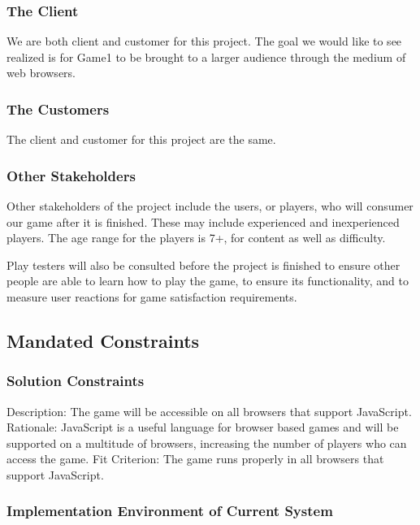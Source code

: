 \documentclass[12pt, titlepage]{article}
\begin{document}
\subsubsection{The Client}

We are both client and customer for this project. The goal we would like to see realized is for Game1 to be brought to a larger audience through the medium of web browsers. 

\subsubsection{The Customers}

The client and customer for this project are the same.

\subsubsection{Other Stakeholders}

Other stakeholders of the project include the users, or players, who will consumer our game after it is finished. These may include experienced and inexperienced players. The age range for the players is 7+, for content as well as difficulty. 

Play testers will also be consulted before the project is finished to ensure other people are able to learn how to play the game, to ensure its functionality, and to measure user reactions for game satisfaction requirements. 

\subsection{Mandated Constraints}

\subsubsection{Solution Constraints}

Description: The game will be accessible on all browsers that support JavaScript. 
Rationale: JavaScript is a useful language for browser based games and will be supported on a multitude of browsers, increasing the number of players who can access the game. 
Fit Criterion: The game runs properly in all browsers that support JavaScript. 

\subsubsection{Implementation Environment of Current System}
\end{document}
